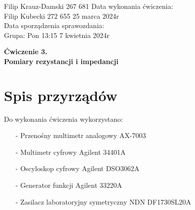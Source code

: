 \documentclass[11pt]{article}
\begin{document}
    \begin{flushleft}
        Filip Krauz-Damski 267 681 \hfill Data wykonania ćwiczenia:\\
        Filip Kubecki 272 655 \hfill 25 marca 2024r\\
        \hfill Data sporządzenia sprawozdania:\\
        Grupa: Pon 13:15 \hfill 7 kwietnia 2024r\\
    \end{flushleft}
    \begin{center}
        \Large\textbf{Ćwiczenie 3.}\\
        \textbf{Pomiary rezystancji i impedancji}
    \end{center}
    \vspace{1cm}

    \section{Spis przyrządów}
    \par{
        Do wykonania ćwiczenia wykorzystano:
        \begin{itemize}
            \setlength\itemsep{0em}
            \item[-] Przenośny multimetr analogowy AX-7003
            \item[-] Multimetr cyfrowy Agilent 34401A
            \item[-] Oscyloskop cyfrowy Agilent DSO3062A
            \item[-] Generator funkcji Agilent 33220A
            \item[-] Zasilacz laboratoryjny symetryczny NDN DF1730SL20A
        \end{itemize}
    }
\end{document}
